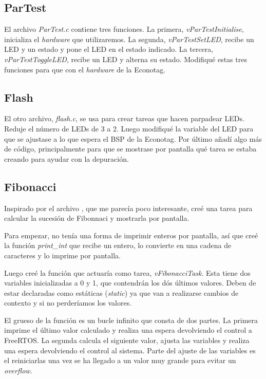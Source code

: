\subsection{ParTest}
El archivo \emph{ParTest.c} contiene tres funciones. La primera, \emph{vParTestInitialise}, inicializa el \emph{hardware} que utilizaremos. La segunda, \emph{vParTestSetLED}, recibe un LED y un estado y pone el LED en el estado indicado. La tercera, \emph{vParTestToggleLED}, recibe un LED y alterna su estado.
Modifiqué estas tres funciones para que  con el \emph{hardware} de la Econotag.\\

\subsection{Flash}
El otro archivo, \emph{flash.c}, se usa para crear tareas que hacen parpadear LEDs. Reduje el número de LEDs de 3 a 2. Luego modifiqué la variable del LED para que se ajustase a lo que espera el BSP de la Econotag.
Por último añadí algo más de código, principalmente para que se mostrase por pantalla qué tarea se estaba creando para ayudar con la depuración.\\

\subsection{Fibonacci}
Inspirado por el archivo , que me parecía poco interesante, creé una tarea para calcular la sucesión de Fibonnaci y mostrarla por pantalla.

Para empezar, no tenía una forma de imprimir enteros por pantalla, así que creé la función \emph{print\_int} que recibe un entero, lo convierte en una cadena de caracteres y lo imprime por pantalla.

Luego creé la función que actuaría como tarea, \emph{vFibonacciTask}. Esta tiene dos variables inicializadas a 0 y 1, que contendrán los dós últimos valores. Deben de estar declaradas como estáticas (\emph{static}) ya que van a realizarse cambios de contexto y si no perderíamos los valores.

El grueso de la función es un bucle infinito que consta de dos partes. La primera imprime el último valor calculado y realiza una espera devolviendo el control a FreeRTOS. La segunda calcula el siguiente valor, ajusta las variables y realiza una espera devolviendo el control al sistema. Parte del ajuste de las variables es el reiniciarlas una vez se ha llegado a un valor muy grande para evitar un \emph{overflow}.\\

